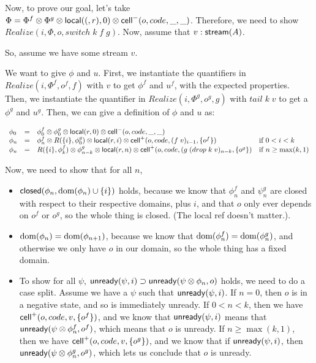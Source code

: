 \documentclass{article}
\begin{document}
Now, to prove our goal, let's take $\Phi = \Phi^f \otimes \Phi^g \otimes \mbox{\textsf{{local}}}({(}, {r}), 0) \otimes \mbox{\textsf{{cell}}}^{-}({o}, {code}, {\_}, {\_})$. Therefore, we need to show $Realize(i, \Phi, o, switch\;k\;f\;g)$. Now, assume that 
$v:\mbox{\textsf{{stream}}}({A})$. 

So, assume we have some stream $v$. 

We want to give $\phi$ and $u$. First, we instantiate the quantifiers
in $Realize(i, \Phi^f, o^f, f)$ with $v$ to get $\phi^f$ and $u^f$,
with the expected properties. Then, we instantiate the quantifier in
$Realize(i, \Phi^g, o^g, g)$ with $tail\;k\;v$ to get a $\phi^g$ and
$u^g$.  Then, we can give a definition of $\phi$ and $u$ as:

\begin{displaymath}
  \begin{array}{lcll}
    \phi_0 & = & \phi^f_0 \otimes \phi^g_0 \otimes \mbox{\textsf{{local}}}({r}, {0}) \otimes \mbox{\textsf{{cell}}}^{-}({o}, {code}, {\_}, {\_}) & \\
    \phi_n & = & \phi^f_n \otimes R(\{{i}\}, \phi^g_0) \otimes 
                 \mbox{\textsf{{local}}}({r}, {i}) \otimes \mbox{\textsf{{cell}}}^{+}({o}, {code}, {(f\;v)_{i-1}}, {\{{o^f}\}})
           & \mbox{if } 0 < i < k  \\
    \phi_n & = & R(\{{i}\}, \phi^f_k) \otimes \phi^g_{n-k} 
                \otimes \mbox{\textsf{{local}}}({r}, {n}) \otimes \mbox{\textsf{{cell}}}^{+}({o}, {code}, {(g\;(drop\;k\;v)_{n-k}}, {\{{o^g}\}})
           & \mbox{if } n \geq \max(k,1) \\
  \end{array}
\end{displaymath}

Now, we need to show that for all $n$, 

\begin{itemize}
\item $\mbox{\textsf{{closed}}}({\phi_n}, {\mbox{dom}({\phi_n})\cup\{{i}\}})$ holds, because
  we know that $\phi^f_n$ and $\psi^g_n$ are closed with respect to
  their respective domains, plus $i$, and that $o$ only ever depends
  on $o^f$ or $o^g$, so the whole thing is closed. (The local ref
  doesn't matter.).

\item $\mbox{dom}({\phi_n}) = \mbox{dom}({\phi_{n+1}})$, because we know that
  $\mbox{dom}({\phi^f_n}) = \mbox{dom}({\phi^g_n})$, and otherwise we only have
  $o$ in our domain, so the whole thing has a fixed domain.

\item To show for all $\psi$, $\mbox{\textsf{{unready}}}({\psi}, {i}) \supset
  \mbox{\textsf{{unready}}}({\psi \otimes \phi_n}, {o})$ holds, we need to do a case
  split. Assume we have a $\psi$ such that $\mbox{\textsf{{unready}}}({\psi}, {i})$. If $n
  = 0$, then $o$ is in a negative state, and so is immediately
  unready. If $0 < n < k$, then we have
  $\mbox{\textsf{{cell}}}^{+}({o}, {code}, {v}, {\{{o^f}\}})$, and we know that
  $\mbox{\textsf{{unready}}}({\psi}, {i})$ means that $\mbox{\textsf{{unready}}}({\psi \otimes
    \phi^f_n}, {o^f})$, which means that $o$ is unready. If $n \geq \max(k,1)$,
  then we have $\mbox{\textsf{{cell}}}^{+}({o}, {code}, {v}, {\{{o^g}\}})$, and we know that
  if $\mbox{\textsf{{unready}}}({\psi}, {i})$, then $\mbox{\textsf{{unready}}}({\psi \otimes \phi^g_n}, {o^g})$,
  which lets us conclude that $o$ is unready.
\end{itemize}
\end{document}
